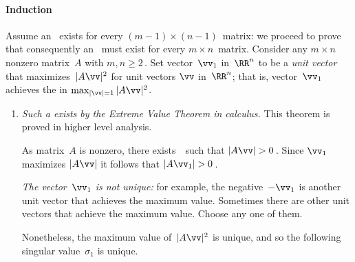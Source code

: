 \paragraph{Induction}  
Assume  an \svd\ exists for every \((m-1)\times(n-1)\)~matrix: we proceed to prove that consequently an \svd\ must exist for every \(m\times n\)~matrix.
Consider any \(m\times n\) nonzero matrix~\(A\) with \(m,n\geq2\)\,.
Set vector~\(\vv_1\) in~\(\RR^n\) to be a \emph{unit vector} that maximizes~\(|A\vv|^2\) for unit vectors \(\vv\) in~\(\RR^n\); that is, vector~\(\vv_1\) achieves the  in \(\max_{|\vv|=1}|A\vv|^2\).
\begin{enumerate}
\item \emph{Such a  exists by the Extreme Value Theorem in calculus.}
This theorem is proved in higher level analysis.

%
As matrix~\(A\) is nonzero, there exists~\vv\ such that \(|A\vv|>0\)\,.
Since \(\vv_1\) maximizes \(|A\vv|\) it follows that \(|A\vv_1|>0\)\,.

\emph{The vector~\(\vv_1\) is not unique:} for example, the negative~\(-\vv_1\) is another unit vector that achieves the maximum value.  
Sometimes there are other unit vectors that achieve the maximum value. 
Choose any one of them. 

Nonetheless, the maximum value of~\(|A\vv|^2\) is unique, and so the following singular value~\(\sigma_1\) is unique.


\end{enumerate}
